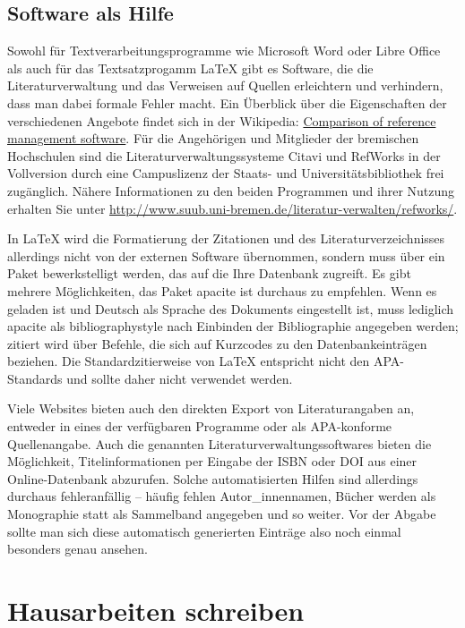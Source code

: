 \documentclass[ngerman,oneside,12pt,a4paper]{scrbook}
\begin{document}
\hypertarget{sec:software}{\section{Software als
Hilfe}\label{sec:software}}

Sowohl für Textverarbeitungsprogramme wie Microsoft Word oder Libre
Office als auch für das Textsatzprogamm LaTeX gibt es Software, die die
Literaturverwaltung und das Verweisen auf Quellen erleichtern und
verhindern, dass man dabei formale Fehler macht. Ein Überblick über die
Eigenschaften der verschiedenen Angebote findet sich in der Wikipedia:
\href{http://en.wikipedia.org/wiki/Comparison_of_reference_management_software}{Comparison
of reference management software}. Für die Angehörigen und Mitglieder
der bremischen Hochschulen sind die Literaturverwaltungssysteme Citavi
und RefWorks in der Vollversion durch eine Campuslizenz der Staats- und
Universitätsbibliothek frei zugänglich. Nähere Informationen zu den
beiden Programmen und ihrer Nutzung erhalten Sie unter
\url{http://www.suub.uni-bremen.de/literatur-verwalten/refworks/}.

In LaTeX wird die Formatierung der Zitationen und des
Literaturverzeichnisses allerdings nicht von der externen Software
übernommen, sondern muss über ein Paket bewerkstelligt werden, das auf
die Ihre Datenbank zugreift. Es gibt mehrere Möglichkeiten, das Paket
apacite ist durchaus zu empfehlen. Wenn es geladen ist und Deutsch als
Sprache des Dokuments eingestellt ist, muss lediglich apacite als
bibliographystyle nach Einbinden der Bibliographie angegeben werden;
zitiert wird über Befehle, die sich auf Kurzcodes zu den
Datenbankeinträgen beziehen. Die Standardzitierweise von LaTeX
entspricht nicht den APA-Standards und sollte daher nicht verwendet
werden.

Viele Websites bieten auch den direkten Export von Literaturangaben an,
entweder in eines der verfügbaren Programme oder als APA-konforme
Quellenangabe. Auch die genannten Literaturverwaltungssoftwares bieten
die Möglichkeit, Titelinformationen per Eingabe der ISBN oder DOI aus
einer Online-Datenbank abzurufen. Solche automatisierten Hilfen sind
allerdings durchaus fehleranfällig -- häufig fehlen Autor\_innennamen,
Bücher werden als Monographie statt als Sammelband angegeben und so
weiter. Vor der Abgabe sollte man sich diese automatisch generierten
Einträge also noch einmal besonders genau ansehen.

\chapter{Hausarbeiten schreiben}\label{hausarbeiten-schreiben}
\end{document}
